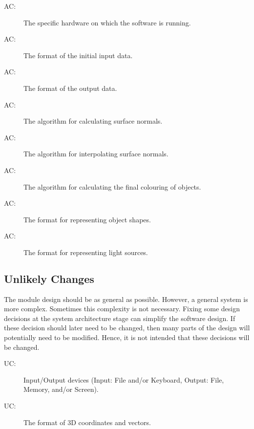 \documentclass[12pt, titlepage]{article}
\newcounter{acnum}
\newcommand{\actheacnum}{AC\theacnum}
\newcounter{ucnum}
\newcommand{\uctheucnum}{UC\theucnum}
\begin{document}
\begin{description}
\item[ \actheacnum \label{acHardware}:] The specific
  hardware on which the software is running.
\item[ \actheacnum \label{acInput}:] The format of the
  initial input data.
\item[ \actheacnum \label{acOutput}:] The format of the
output data.
\item[ \actheacnum \label{acNormalCalculation}:] The 
algorithm for calculating surface normals. %
\item[ \actheacnum \label{acNormalInterpolation}:] The 
algorithm for interpolating surface normals.
\item[ \actheacnum \label{acLightingModels}:] The 
algorithm for calculating the final colouring of objects. %
\item[ \actheacnum \label{acShapes}:] The 
format for representing object shapes. 
\item[ \actheacnum \label{acLights}:] The 
format for representing light sources. 

\end{description}

\subsection{Unlikely Changes} \label{SecUchange}
The module design should be as general as possible. However, a general system is
more complex. Sometimes this complexity is not necessary. Fixing some design
decisions at the system architecture stage can simplify the software design. If
these decision should later need to be changed, then many parts of the design
will potentially need to be modified. Hence, it is not intended that these
decisions will be changed.

\begin{description}
\item[ \uctheucnum \label{ucIO}:] Input/Output devices
  (Input: File and/or Keyboard, Output: File, Memory, and/or Screen).
\item[ \uctheucnum \label{ucCartesian}:] The format of 3D 
coordinates and vectors.

\end{description}
\end{document}
